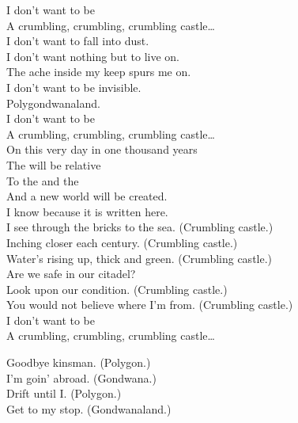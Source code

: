 I don't want to be \\
A crumbling, crumbling, crumbling castle… \\

I don't want to fall into dust. \\
I don't want nothing but to live on. \\
The ache inside my keep spurs me on. \\
I don't want to be invisible. \\
Polygondwanaland. \\

I don't want to be \\
A crumbling, crumbling, crumbling castle… \\

On this very day in one thousand years \\
The  will be relative \\
To the  and the  \\
And a new world will be created. \\
I know because it is written here. \\

I see through the bricks to the sea. (Crumbling castle.) \\
Inching closer each century. (Crumbling castle.) \\
Water's rising up, thick and green. (Crumbling castle.) \\

Are we safe in our citadel? \\
Look upon our condition. (Crumbling castle.) \\
You would not believe where I'm from. (Crumbling castle.) \\

I don't want to be \\
A crumbling, crumbling, crumbling castle… \\





Goodbye kinsman. (Polygon.) \\
I'm goin' abroad. (Gondwana.) \\
Drift until I. (Polygon.) \\
Get to my stop. (Gondwanaland.) \\

